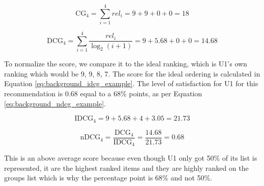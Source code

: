 \begin{equation}\label{eq:background_cg_example}
\text{CG}_4 = \sum_{i=1}^{4}\textit{rel}_i = 9 + 9 + 0 + 0 = 18
\end{equation}

\begin{equation}\label{eq:background_dcg_example}
\text{DCG}_4 = \sum_{i=1}^{4}\frac{\textit{rel}_i}{\log_2(i + 1)}
= 9 + 5.68 + 0 + 0 = 14.68
\end{equation}

To normalize the score, we compare it to the ideal ranking, which is U1's own ranking which would be 9, 9, 8, 7. The score for the ideal ordering is calculated in Equation \ref{eq:background_idcg_example}. The level of satisfaction for U1 for this recommendation is $0.68$ equal to a 68\% points, as per Equation \ref{eq:background_ndcg_example}. 

\begin{equation}\label{eq:background_idcg_example}
\text{IDCG}_4 = 9 + 5.68 + 4 + 3.05 = 21.73
\end{equation}

\begin{equation}\label{eq:background_ndcg_example}
\text{nDCG}_4 = \frac{\text{DCG}_4}{\text{IDCG}_4} = \frac{14.68}{21.73}=0.68
\end{equation}

This is an above average score because even though U1 only got 50\% of its list is represented, it are the highest ranked items and they are highly ranked on the groups list which is why the percentage point is 68\% and not 50\%. 
